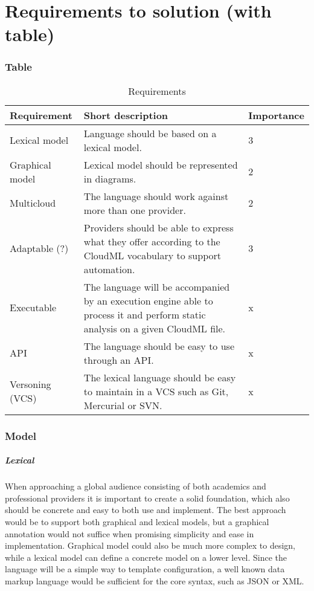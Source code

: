 \chapter{Requirements to solution (with table)}


\subsection{Table}
\begin{table}
    \caption{Requirements}
    \begin{tabular}{ | l | p{7cm} | l | }
      \hline
      \textbf{Requirement} & \textbf{Short description} & \textbf{Importance} \\ \hline
      Lexical model & Language should be based on a lexical model. & 3 \\ \hline
      Graphical model & Lexical model should be represented in diagrams. & 2 \\ \hline
      Multicloud & The language should work against more than one provider. & 2 \\ \hline
      Adaptable (?) & Providers should be able to express what they offer according to the CloudML vocabulary to support automation. & 3 \\ \hline
      Executable & The language will be accompanied by an execution engine able to process it and perform static analysis on a given CloudML file. & x \\ \hline
      API & The language should be easy to use through an API. & x \\ \hline
      Versoning (VCS) & The lexical language should be easy to maintain in a VCS such as Git, Mercurial or SVN. & x \\ \hline
    \end{tabular}
\end{table}

\subsection{Model}
\paragraph{Lexical}
When approaching a global audience consisting of both academics and professional providers it is important to create a solid foundation, 
which also should be concrete and easy to both use and implement.
The best approach would be to support both graphical and lexical models, 
but a graphical annotation would not suffice when promising simplicity and ease in implementation. 
Graphical model could also be much more complex to design, while a lexical model can define a concrete model on a lower level.
Since the language will be a simple way to template configuration, a well known data markup language would be sufficient for the core syntax, such as JSON or XML.

